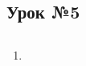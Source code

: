 \subsection{Урок №5}

\subsection*{}
\begin{multicols}{2}
    \begin{enumerate}\setlength{\itemsep}{0pt}
        \item
    \end{enumerate}
\end{multicols}

\subsection*{}

\begin{verbatim}
\end{verbatim}